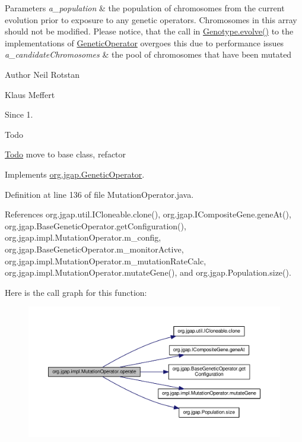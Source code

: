 \begin{DoxyParams}{Parameters}
{\em a\-\_\-population} & the population of chromosomes from the current evolution prior to exposure to any genetic operators. Chromosomes in this array should not be modified. Please notice, that the call in \hyperlink{classorg_1_1jgap_1_1_genotype_a54a6791fbb6e13920e79f4e2dd719eb4}{Genotype.\-evolve()} to the implementations of \hyperlink{interfaceorg_1_1jgap_1_1_genetic_operator}{Genetic\-Operator} overgoes this due to performance issues \\
\hline
{\em a\-\_\-candidate\-Chromosomes} & the pool of chromosomes that have been mutated\\
\hline
\end{DoxyParams}
\begin{DoxyAuthor}{Author}
Neil Rotstan 

Klaus Meffert 
\end{DoxyAuthor}
\begin{DoxySince}{Since}
1. 
\end{DoxySince}
\begin{DoxyRefDesc}{Todo}
\item[\hyperlink{todo__todo000173}{Todo}]move to base class, refactor \end{DoxyRefDesc}


Implements \hyperlink{interfaceorg_1_1jgap_1_1_genetic_operator_a0f9dfe925c4c21e07522be67d6c5d084}{org.\-jgap.\-Genetic\-Operator}.



Definition at line 136 of file Mutation\-Operator.\-java.



References org.\-jgap.\-util.\-I\-Cloneable.\-clone(), org.\-jgap.\-I\-Composite\-Gene.\-gene\-At(), org.\-jgap.\-Base\-Genetic\-Operator.\-get\-Configuration(), org.\-jgap.\-impl.\-Mutation\-Operator.\-m\-\_\-config, org.\-jgap.\-Base\-Genetic\-Operator.\-m\-\_\-monitor\-Active, org.\-jgap.\-impl.\-Mutation\-Operator.\-m\-\_\-mutation\-Rate\-Calc, org.\-jgap.\-impl.\-Mutation\-Operator.\-mutate\-Gene(), and org.\-jgap.\-Population.\-size().



Here is the call graph for this function\-:
\nopagebreak
\begin{figure}[H]
\begin{center}
\leavevmode
\includegraphics[width=350pt]{classorg_1_1jgap_1_1impl_1_1_mutation_operator_a4a1c852770559bba4ffa3e9718f4a0d8_cgraph}
\end{center}
\end{figure}


